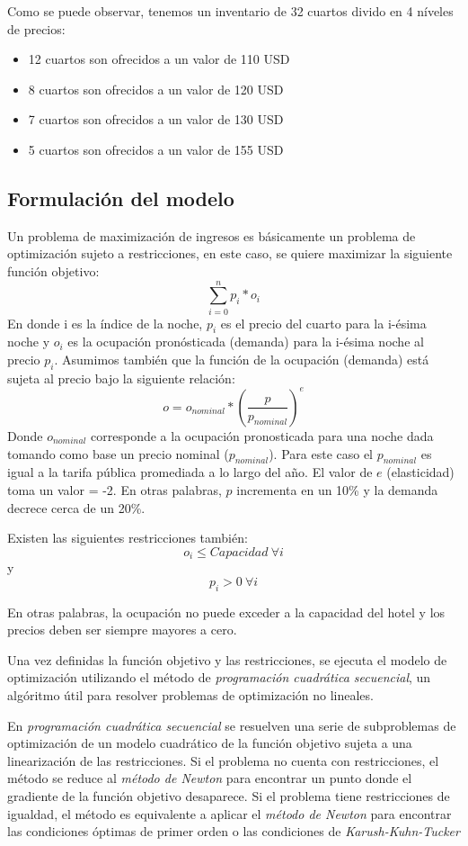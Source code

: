 Como se puede observar, tenemos un inventario de 32 cuartos divido en 4 níveles de precios:
\begin{itemize}[noitemsep]
\item 12 cuartos son ofrecidos a un valor de 110 USD
\item 8 cuartos son ofrecidos a un valor de 120 USD
\item 7 cuartos son ofrecidos a un valor de 130 USD
\item 5 cuartos son ofrecidos a un valor de 155 USD
\end{itemize}

\subsection*{Formulación del modelo}

Un problema de maximización de ingresos es básicamente un problema de optimización sujeto a restricciones, en este caso, se quiere maximizar la siguiente función objetivo:
$$\sum_{i=0}^{n}p_i*o_i$$
En donde i es la índice de la noche, $p_i$ es el precio del cuarto para la i-ésima noche y $o_i$ es la ocupación pronósticada (demanda) para la i-ésima noche al precio $p_i$. Asumimos también que la función de la ocupación (demanda) está sujeta al precio bajo la siguiente relación:
$$o = o_{nominal} * (\frac{p}{p_{nominal}})^e$$
Donde $o_{nominal}$ corresponde a la ocupación pronosticada para una noche dada tomando como base un precio nominal ($p_{nominal}$). Para este caso el $p_{nominal}$ es igual a la tarifa pública promediada a lo largo del año. El valor de $e$ (elasticidad) toma un valor = -2. En otras palabras, $p$ incrementa en un 10\% y la demanda decrece cerca de un 20\%.

Existen las siguientes restricciones también: $$o_i \leq Capacidad\ \forall i$$ y $$p_i > 0\ \forall i$$

En otras palabras, la ocupación no puede exceder a la capacidad del hotel y los precios deben ser siempre mayores a cero.

Una vez definidas la función objetivo y las restricciones, se ejecuta el modelo de optimización utilizando el método de \emph{programación cuadrática secuencial}, un algóritmo útil para resolver problemas de optimización no lineales.

En \emph{programación cuadrática secuencial} se resuelven una serie de subproblemas de optimización de un modelo cuadrático de la función objetivo sujeta a una linearización de las restricciones. Si el problema no cuenta con restricciones, el método se reduce al \emph{método de Newton} para encontrar un punto donde el gradiente de la función objetivo desaparece. Si el problema tiene restricciones de igualdad, el método es equivalente a aplicar el \emph{método de Newton} para encontrar las condiciones óptimas de primer orden o las condiciones de \emph{Karush-Kuhn-Tucker}


